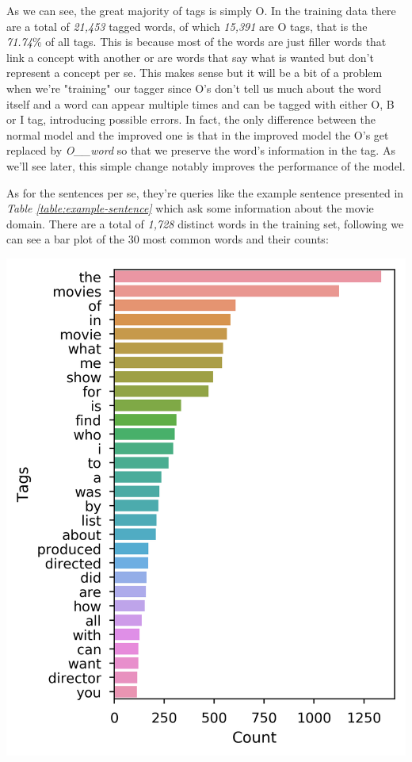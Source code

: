 \documentclass[11pt,a4paper]{article}
\begin{document}
	As we can see, the great majority of tags is simply O. In the training data there are a total of \textit{21,453} tagged words, of which \textit{15,391} are O tags, that is the \textit{71.74}\% of all tags. This is because most of the words are just filler words that link a concept with another or are words that say what is wanted but don't represent a concept per se. This makes sense but it will be a bit of a problem when we're "training" our tagger since O's don't tell us much about the word itself and a word can appear multiple times and can be tagged with either O, B or I tag, introducing possible errors. In fact, the only difference between the normal model and the improved one is that in the improved model the O's get replaced by \textit{O\_\_word} so that we preserve the word's information in the tag. As we'll see later, this simple change notably improves the performance of the model. 
	
	As for the sentences per se, they're queries like the example sentence presented in \textit{Table \ref{table:example-sentence}} which ask some information about the movie domain. There are a total of \textit{1,728} distinct words in the training set, following we can see a bar plot of the 30 most common words and their counts:

	\hspace*{-0.9cm}\includegraphics[scale=0.7]{barplot_iob&w_tag_counts_onlyW}
	
\end{document}
